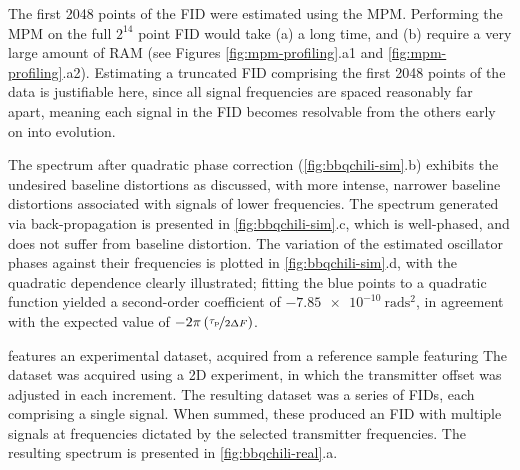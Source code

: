 The first 2048 points of the \ac{FID} were estimated using the \ac{MPM}.
Performing the \ac{MPM} on the full $2^{14}$ point \ac{FID} would take (a) a
long time, and (b) require a very large amount of \ac{RAM} (see Figures
\ref{fig:mpm-profiling}.a1 and \ref{fig:mpm-profiling}.a2).
Estimating a truncated \ac{FID} comprising the first 2048 points of the
data is justifiable here, since all signal frequencies are spaced
reasonably far apart, meaning each signal in the \ac{FID} becomes
resolvable from the others early on into evolution.
\label{corr:bbq-limitations}

The spectrum after quadratic phase correction (\cref{fig:bbqchili-sim}.b)
exhibits the undesired baseline distortions as discussed, with more intense,
narrower baseline distortions associated with signals of lower frequencies.
The spectrum generated via back-propagation is presented in
\cref{fig:bbqchili-sim}.c, which is well-phased, and does not suffer from
baseline distortion. The variation of the estimated oscillator
phases against their frequencies is plotted in \cref{fig:bbqchili-sim}.d, with
the quadratic dependence clearly illustrated; fitting the blue points to a
quadratic function yielded a second-order coefficient of
$\qty{-7.85e-10}{\radian\second\squared}$, in agreement with the expected value
of $-2 \pi \left(\nicefrac{\tau_{\text{p}}}{2 \Updelta F}\right)$.

 features an experimental dataset, acquired
from a reference sample featuring
\label{corr:gd-h2o}
The dataset was acquired using a \ac{2D} experiment, in which the transmitter
offset was adjusted in each increment. The resulting dataset was a series of
\acp{FID}, each comprising a single  signal.
When summed, these produced an \ac{FID} with multiple signals at frequencies
dictated by the selected transmitter frequencies. The resulting spectrum is
presented in \cref{fig:bbqchili-real}.a.

